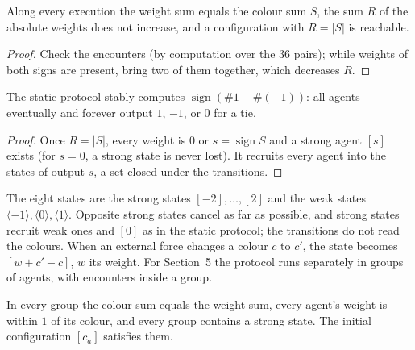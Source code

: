 \begin{lemma}\label{lem:em-static}
\leanok{}
Along every execution the weight sum equals the colour sum $S$, the sum $R$ of the absolute
weights does not increase, and a configuration with $R = |S|$ is reachable.
\end{lemma}
\begin{proof}\leanok
Check the encounters (by computation over the $36$ pairs); while weights of both signs are
present, bring two of them together, which decreases $R$.
\end{proof}

\begin{theorem}\label{thm:em-static}
\leanok{}
The static protocol stably computes $\operatorname{sign}(\#1 - \#(-1))$: all agents eventually
and forever output $1$, $-1$, or $0$ for a tie.
\end{theorem}
\begin{proof}\leanok
Once $R = |S|$, every weight is $0$ or $s = \operatorname{sign} S$ and a strong agent $[s]$
exists (for $s = 0$, a strong state is never lost). It recruits every agent into the states of
output $s$, a set closed under the transitions.
\end{proof}

\begin{definition}\label{def:em-dynamic}
\leanok{}
The eight states are the strong states $[-2], \dots, [2]$ and the weak states
$\langle -1 \rangle, \langle 0 \rangle, \langle 1 \rangle$. Opposite strong states cancel as far
as possible, and strong states recruit weak ones and $[0]$ as in the static protocol; the
transitions do not read the colours. When an external force changes a colour $c$ to $c'$, the
state becomes $[w + c' - c]$, $w$ its weight. For Section~5 the protocol runs separately in groups
of agents, with encounters inside a group.
\end{definition}

\begin{definition}\label{def:em-dyninv}
\leanok{}
In every group the colour sum equals the weight sum, every agent's weight is within $1$ of its
colour, and every group contains a strong state. The initial configuration $[c_a]$ satisfies
them.
\end{definition}

